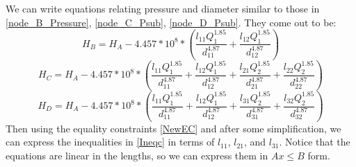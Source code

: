 \documentclass{homework}
\begin{document}
We can write equations relating pressure and diameter similar to those in \ref{node_B_Pressure}, \ref{node_C_Psub}, \ref{node_D_Psub}. They come out to be:
\begin{equation}
H_B = H_A - 4.457*10^8*(\frac{l_{11}Q_1^{1.85}}{d_{11}^{4.87}} + \frac{l_{12}Q_1^{1.85}}{d_{12}^{4.87}})
\end{equation}
\begin{equation}
H_C = H_A - 4.457*10^8*(\frac{l_{11}Q_1^{1.85}}{d_{11}^{4.87}} + \frac{l_{12}Q_1^{1.85}}{d_{12}^{4.87}} + \frac{l_{21}Q_2^{1.85}}{d_{21}^{4.87}} + \frac{l_{22}Q_2^{1.85}}{d_{22}^{4.87}})
\end{equation}
\begin{equation}
H_D = H_A - 4.457*10^8*(\frac{l_{11}Q_1^{1.85}}{d_{11}^{4.87}} + \frac{l_{12}Q_1^{1.85}}{d_{12}^{4.87}} + \frac{l_{31}Q_2^{1.85}}{d_{31}^{4.87}} + \frac{l_{32}Q_2^{1.85}}{d_{32}^{4.87}})
\end{equation}
Then using the equality constraints \ref{NewEC} and after some simplification, we can express the inequalities in \ref{Ineqc} in terms of $l_{11}$, $l_{21}$, and $l_{31}$. Notice that the equations are linear in the lengths, so we can express them in $Ax \leq B$ form.
\end{document}
